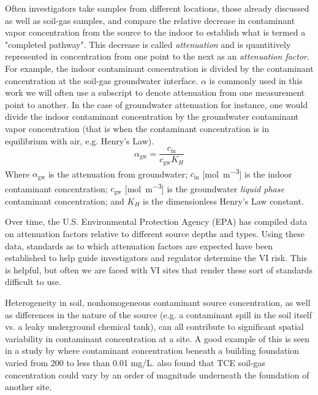 Often investigators take samples from different locations, those already discussed as well as soil-gas samples, and compare the relative decrease in contaminant vapor concentration from the source to the indoor to establish what is termed a "completed pathway".
This decrease is called \textit{attenuation} and is quantitively represented in concentration from one point to the next as an \textit{attenuation factor}.
For example, the indoor contaminant concentration is divided by the contaminant concentration at the soil-gas groundwater interface.
$\alpha$ is commonly used in this work we will often use a subscript to denote attenuation from one measurement point to another.
In the case of groundwater attenuation for instance, one would divide the indoor contaminant concentration by the groundwater contaminant vapor concentration (that is when the contaminant concentration is in equilibrium with air, e.g. Henry's Law).
\begin{equation}
  \alpha_\mathrm{gw} = \frac{c_\mathrm{in}}{c_\mathrm{gw} K_H}
\end{equation}
Where $\alpha_\mathrm{gw}$  is the attenuation from groundwater;
$c_\mathrm{in}$ [\si{\mol\per\metre\cubed}] is the indoor contaminant concentration;
$c_\mathrm{gw}$ [\si{\mol\per\metre\cubed}] is the groundwater \textit{liquid phase} contaminant concentration;
and $K_H$ is the dimensionless Henry's Law constant.\par

Over time, the U.S. Environmental Protection Agency (EPA) has compiled data on attenuation factors relative to different source depths and types.
Using these data, standards as to which attenuation factors are expected have been established to help guide investigators and regulator determine the VI risk.
This is helpful, but often we are faced with VI sites that render these sort of standards difficult to use.

Heterogeneity in soil, nonhomogeneous contaminant source concentration, as well as differences in the nature of the source (e.g. a contaminant spill in the soil itself vs. a leaky underground chemical tank), can all contribute to significant spatial variability in contaminant concentration at a site.
A good example of this is seen in a study by \citeauthor{luo_spatial_2009}\cite{luo_spatial_2009} where contaminant concentration beneath a building foundation varied from 200 to less than 0.01 mg/L.
\citeauthor{bekele_influence_2014}\cite{bekele_influence_2014} also found that TCE soil-gas concentration could vary by an order of magnitude underneath the foundation of another site.\par

